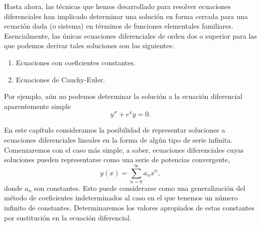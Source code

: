 \makeatletter
\ifdefined\bbereffixdone\else
  \def\bbereffixdone{}
\fi
\makeatother
 
\providecommand{\bbezero}[2]{\addplot[bbegray!70, thin, forget plot] coordinates {(#1,0) (#2,0)};}
 
 
Hasta ahora, las técnicas que hemos desarrollado para resolver ecuaciones diferenciales han implicado determinar una solución en forma cerrada para una ecuación dada (o sistema) en términos de funciones elementales familiares. Esencialmente, las únicas ecuaciones diferenciales de orden dos o superior para las que podemos derivar tales soluciones son las siguientes:
 
\begin{enumerate}
    \item Ecuaciones con coeficientes constantes.
    \item Ecuaciones de Cauchy-Euler.
\end{enumerate}
 
Por ejemplo, aún no podemos determinar la solución a la ecuación diferencial aparentemente simple
\[ y'' + e^x y = 0. \]
 
En este capítulo consideramos la posibilidad de representar soluciones a ecuaciones diferenciales lineales en la forma de algún tipo de serie infinita. Comenzaremos con el caso más simple, a saber, ecuaciones diferenciales cuyas soluciones pueden representarse como una serie de potencias convergente,
\[ y(x) = \sum_{n=0}^{\infty} a_n x^n, \]
donde $a_n$ son constantes. Esto puede considerarse como una generalización del método de coeficientes indeterminados al caso en el que tenemos un número infinito de constantes. Determinaremos los valores apropiados de estas constantes por sustitución en la ecuación diferencial.
 
